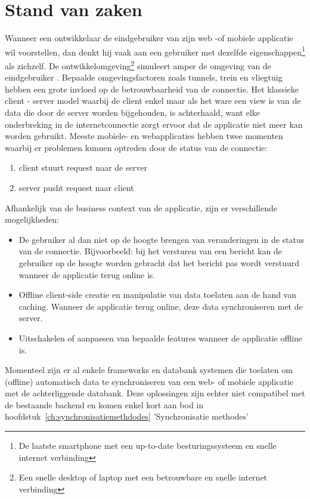 \section{Stand van zaken}
\label{sec:stand-van-zaken}
Wanneer een ontwikkelaar de eindgebruiker van zijn web -of mobiele applicatie wil voorstellen, dan denkt hij vaak aan een gebruiker met dezelfde eigenschappen\footnote{De laatste smartphone met een up-to-date besturingssysteem en snelle internet verbinding} als zichzelf. De ontwikkelomgeving\footnote{Een snelle desktop of laptop met een betrouwbare en snelle internet verbinding} simuleert amper de omgeving\autocite{EuropeseCommissie2015Connectivity}\autocite{EuropeseCommissie2016Integration} van de eindgebruiker \autocite{chrome-offline-first-statement}. Bepaalde omgevingsfactoren zoals tunnels, trein en vliegtuig hebben een grote invloed op de betrouwbaarheid van de connectie. Het klassieke client - server model waarbij de client enkel maar als het ware een view is van de data die door de server worden bijgehouden, is achterhaald, want elke onderbreking in de internetconnectie zorgt ervoor dat de applicatie niet meer kan worden gebruikt.
\clearpage
Meeste mobiele- en webapplicaties hebben twee momenten waarbij er problemen kunnen optreden door de status van de connectie:
\begin{enumerate}  
\item client stuurt request naar de server
\item server pusht request naar client
\end{enumerate}
Afhankelijk van de business context van de applicatie, zijn er verschillende mogelijkheden\autocite{Go2015}:
\begin{itemize}  
\item De gebruiker al dan niet op de hoogte brengen van veranderingen in de status van de connectie. Bijvoorbeeld: bij het versturen van een bericht kan de gebruiker op de hoogte worden gebracht dat het bericht pas wordt verstuurd wanneer de applicatie terug online is.
\item Offline client-side creatie en manipulatie van data toelaten aan de hand van caching. Wanneer de applicatie terug online, deze data synchroniseren met de server.
\item Uitschakelen of aanpassen van bepaalde features wanneer de applicatie offline is.
\end{itemize}
Momenteel zijn er al enkele frameworks en databank systemen die toelaten om (offline) automatisch data te synchroniseren van een web- of mobiele applicatie met de achterliggende databank. Deze oplossingen zijn echter niet compatibel met de bestaande backend en komen enkel kort aan bod in hoofdstuk~\ref{ch:synchronisatiemethdodes} 'Synchronisatie methodes'
